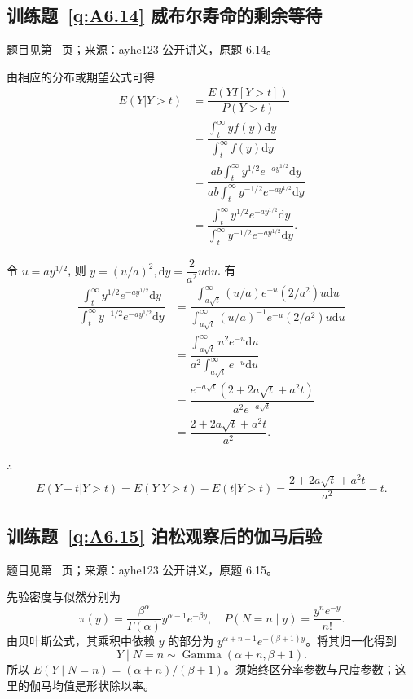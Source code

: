 \subsection*{训练题~\ref{q:A6.14} 威布尔寿命的剩余等待}\label{a:A6.14}{\small 题目见第~\pageref{q:A6.14} 页；来源：ayhe123 公开讲义，原题 6.14。}
\begin{solve}
    由相应的分布或期望公式可得
    \begin{align*}
        E(Y|Y>t) & =\dfrac{E(YI[Y>t])}{P(Y>t)} \\
        & =\dfrac{\int_t^\infty yf(y)\mathrm{d}y}{\int_t^\infty f(y)\mathrm{d}y} \\
        & =\dfrac{ab\int_t^\infty y^{1/2}e^{-ay^{1/2}}\mathrm{d}y}{ab\int_t^\infty y^{-1/2}e^{-ay^{1/2}}\mathrm{d}y} \\
        & =\dfrac{\int_t^\infty y^{1/2}e^{-ay^{1/2}}\mathrm{d}y}{\int_t^\infty y^{-1/2}e^{-ay^{1/2}}\mathrm{d}y}.
    \end{align*}

    令 $u=ay^{1/2}$, 则 $y=(u/a)^2,\mathrm{d}y=\dfrac{2}{a^2}u\mathrm{d}u$. 有
    \begin{align*}
        \dfrac{\int_t^\infty y^{1/2}e^{-ay^{1/2}}\mathrm{d}y}{\int_t^\infty y^{-1/2}e^{-ay^{1/2}}\mathrm{d}y} & =\dfrac{\int_{a\sqrt{t}}^\infty(u/a)e^{-u}(2/a^2)u\mathrm{d}u}{\int_{a\sqrt{t}}^\infty(u/a)^{-1}e^{-u}(2/a^2)u\mathrm{d}u} \\
        & =\dfrac{\int_{a\sqrt{t}}^\infty u^2e^{-u}\mathrm{d}u}{a^2\int_{a\sqrt{t}}^\infty e^{-u}\mathrm{d}u} \\
        & =\dfrac{e^{-a\sqrt{t}}(2+2a\sqrt{t}+a^2t)}{a^2e^{-a\sqrt{t}}} \\
        & =\dfrac{2+2a\sqrt{t}+a^2t}{a^2}.
    \end{align*}

    $\therefore$
    \[E(Y-t|Y>t)=E(Y|Y>t)-E(t|Y>t)=\dfrac{2+2a\sqrt{t}+a^2t}{a^2}-t.\]
\end{solve}

\subsection*{训练题~\ref{q:A6.15} 泊松观察后的伽马后验}\label{a:A6.15}{\small 题目见第~\pageref{q:A6.15} 页；来源：ayhe123 公开讲义，原题 6.15。}
\begin{solve}先验密度与似然分别为\[\pi(y)=\frac{\beta^\alpha}{\Gamma(\alpha)}y^{\alpha-1}e^{-\beta y},\quad P(N=n\mid y)=\frac{y^ne^{-y}}{n!}.\]由贝叶斯公式，其乘积中依赖 $y$ 的部分为 $y^{\alpha+n-1}e^{-(\beta+1)y}$。将其归一化得到\[Y\mid N=n\sim\operatorname{Gamma}(\alpha+n,\beta+1).\]所以 $E(Y\mid N=n)=(\alpha+n)/(\beta+1)$。须始终区分率参数与尺度参数；这里的伽马均值是形状除以率。\end{solve}

